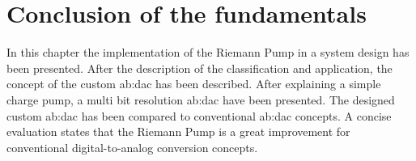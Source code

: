 \section{Conclusion of the fundamentals}
In this chapter the implementation of the Riemann Pump in a system design has been presented.
After the description of the classification and application, the concept of the custom \gls{ab:dac} has been described.
After explaining a simple charge pump, a multi bit resolution \gls{ab:dac} have been presented.
The designed custom \gls{ab:dac} has been compared to conventional \gls{ab:dac} concepts.
A concise evaluation states that the Riemann Pump is a great improvement for conventional digital-to-analog conversion concepts.
